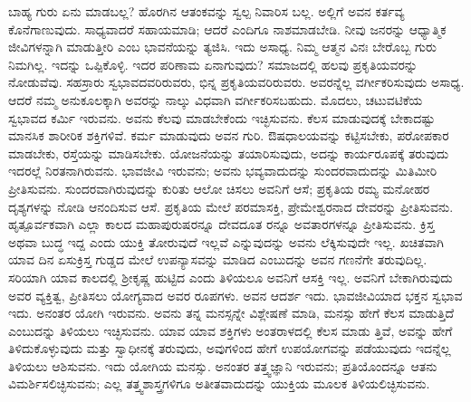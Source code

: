 ಬಾಹ್ಯ ಗುರು ಏನು ಮಾಡಬಲ್ಲ? ಹೊರಗಿನ ಆತಂಕವನ್ನು ಸ್ವಲ್ಪ ನಿವಾರಿಸ ಬಲ್ಲ. ಅಲ್ಲಿಗೆ ಅವನ ಕರ್ತವ್ಯ ಕೊನೆಗಾಣುವುದು. ಸಾಧ್ಯವಾದರೆ ಸಹಾಯಮಾಡಿ; ಆದರೆ ಎಂದಿಗೂ ನಾಶಮಾಡಬೇಡಿ. ನೀವು ಜನರನ್ನು ಆಧ್ಯಾತ್ಮಿಕ ಜೀವಿಗಳನ್ನಾಗಿ ಮಾಡುತ್ತೀರಿ ಎಂಬ ಭಾವನೆಯನ್ನು ತ್ಯಜಿಸಿ. ಇದು ಅಸಾಧ್ಯ. ನಿಮ್ಮ ಆತ್ಮನ ವಿನಃ ಬೇರೊಬ್ಬ ಗುರು ನಿಮಗಿಲ್ಲ. ಇದನ್ನು ಒಪ್ಪಿಕೊಳ್ಳಿ. ಇದರ ಪರಿಣಾಮ ಏನಾಗುವುದು? ಸಮಾಜದಲ್ಲಿ ಹಲವು ಪ್ರಕೃತಿಯವರನ್ನು ನೋಡುವೆವು. ಸಹಸ್ರಾರು ಸ್ವಭಾವದವರಿರುವರು, ಭಿನ್ನ ಪ್ರಕೃತಿಯವರಿರುವರು. ಅವರನ್ನೆಲ್ಲ ವರ್ಗೀಕರಿಸುವುದು ಅಸಾಧ್ಯ. ಆದರೆ ನಮ್ಮ ಅನುಕೂಲಕ್ಕಾಗಿ ಅವರನ್ನು ನಾಲ್ಕು ವಿಧವಾಗಿ ವರ್ಗೀಕರಿಸಬಹುದು. ಮೊದಲು, ಚಟುವಟಿಕೆಯ ಸ್ವಭಾವದ ಕರ್ಮಿ ಇರುವನು. ಅವನು ಕೆಲವು ಮಾಡಬೇಕೆಂದು ಇಚ್ಛಿಸುವನು. ಕೆಲಸ ಮಾಡುವುದಕ್ಕೆ ಬೇಕಾದಷ್ಟು ಮಾನಸಿಕ ಶಾರೀರಿಕ ಶಕ್ತಿಗಳಿವೆ. ಕರ್ಮ ಮಾಡುವುದು ಅವನ ಗುರಿ. ಔಷಧಾಲಯವನ್ನು ಕಟ್ಟಿಸಬೇಕು, ಪರೋಪಕಾರ ಮಾಡಬೇಕು, ರಸ್ತೆಯನ್ನು ಮಾಡಿಸಬೇಕು. ಯೋಜನೆಯನ್ನು ತಯಾರಿಸುವುದು, ಅದನ್ನು ಕಾರ್ಯರೂಪಕ್ಕೆ ತರುವುದು ಇದರಲ್ಲೆ ನಿರತನಾಗಿರುವನು. ಭಾವಜೀವಿ ಇರುವನು; ಅವನು ಭವ್ಯವಾದುದನ್ನು ಸುಂದರವಾದುದನ್ನು ಮಿತಿಮೀರಿ ಪ್ರೀತಿಸುವನು. ಸುಂದರವಾಗಿರುವುದನ್ನು ಕುರಿತು ಆಲೋ ಚಿಸಲು ಅವನಿಗೆ ಆಸೆ; ಪ್ರಕೃತಿಯ ರಮ್ಯ ಮನೋಹರ ದೃಶ್ಯಗಳನ್ನು ನೋಡಿ ಆನಂದಿಸುವ ಆಸೆ. ಪ್ರಕೃತಿಯ ಮೇಲೆ ಪರಮಾಸಕ್ತಿ, ಪ್ರೇಮೇಶ್ವರನಾದ ದೇವರನ್ನು ಪ್ರೀತಿಸುವನು. ಹೃತ್ಪೂರ್ವಕವಾಗಿ ಎಲ್ಲಾ ಕಾಲದ ಮಹಾಪುರುಷರನ್ನೂ ದೇವದೂತ ರನ್ನೂ ಅವತಾರಗಳನ್ನೂ ಪ್ರೀತಿಸುವನು. ಕ್ರಿಸ್ತ ಅಥವಾ ಬುದ್ಧ ಇದ್ದ ಎಂದು ಯುಕ್ತಿ ತೋರುವುದೆ ಇಲ್ಲವೆ ಎನ್ನುವುದನ್ನು ಅವನು ಲೆಕ್ಕಿಸುವುದೇ ಇಲ್ಲ. ಖಚಿತವಾಗಿ ಯಾವ ದಿನ ಏಸುಕ್ರಿಸ್ತ ಗುಡ್ಡದ ಮೇಲೆ ಉಪನ್ಯಾಸವನ್ನು ಮಾಡಿದ ಎಂಬುದನ್ನು ಅವನ ಗಣನೆಗೇ ತರುವುದಿಲ್ಲ. ಸರಿಯಾಗಿ ಯಾವ ಕಾಲದಲ್ಲಿ ಶ‍್ರೀಕೃಷ್ಣ ಹುಟ್ಟಿದ ಎಂದು ತಿಳಿಯಲೂ ಅವನಿಗೆ ಆಸಕ್ತಿ ಇಲ್ಲ. ಅವನಿಗೆ ಬೇಕಾಗಿರುವುದು ಅವರ ವ್ಯಕ್ತಿತ್ವ, ಪ್ರೀತಿಸಲು ಯೋಗ್ಯವಾದ ಅವರ ರೂಪಗಳು. ಅವನ ಆದರ್ಶ ಇದು. ಭಾವಜೀವಿಯಾದ ಭಕ್ತನ ಸ್ವಭಾವ ಇದು. ಅನಂತರ ಯೋಗಿ ಇರುವನು. ಅವನು ತನ್ನ ಮನಸ್ಸನ್ನೇ ವಿಶ್ಲೇಷಣೆ ಮಾಡಿ, ಮನಸ್ಸು ಹೇಗೆ ಕೆಲಸ ಮಾಡುತ್ತಿದೆ ಎಂಬುದನ್ನು ತಿಳಿಯಲು ಇಚ್ಛಿಸುವನು. ಯಾವ ಯಾವ ಶಕ್ತಿಗಳು ಅಂತರಾಳದಲ್ಲಿ ಕೆಲಸ ಮಾಡು ತ್ತಿವೆ, ಅವನ್ನು ಹೇಗೆ ತಿಳಿದುಕೊಳ್ಳುವುದು ಮತ್ತು ಸ್ವಾಧೀನಕ್ಕೆ ತರುವುದು, ಅವುಗಳಿಂದ ಹೇಗೆ ಉಪಯೋಗವನ್ನು ಪಡೆಯುವುದು ಇದನ್ನೆಲ್ಲ ತಿಳಿಯಲು ಆಶಿಸುವನು. ಇದು ಯೋಗಿಯ ಮನಸ್ಸು. ಅನಂತರ ತತ್ತ್ವಜ್ಞಾನಿ ಇರುವನು; ಪ್ರತಿಯೊಂದನ್ನೂ ಆತನು ವಿಮರ್ಶಿಸಲಿಚ್ಛಿಸುವನು; ಎಲ್ಲ ತತ್ತ್ವಶಾಸ್ತ್ರಗಳಿಗೂ ಅತೀತವಾದುದನ್ನು ಯುಕ್ತಿಯ ಮೂಲಕ ತಿಳಿಯಲಿಚ್ಛಿಸುವನು.

